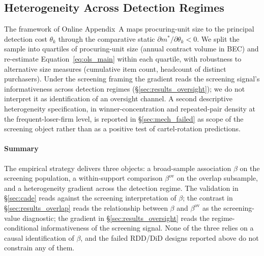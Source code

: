 \subsection{Heterogeneity Across Detection Regimes}
\label{sec:emp_heterogeneity}

The framework of Online Appendix~A maps procuring-unit size to
the principal detection cost $\theta_k$ through the comparative
static $\partial m^{*}/\partial\theta_k<0$. We split the sample
into quartiles of procuring-unit size (annual contract volume
in BEC) and re-estimate Equation~\eqref{eq:ols_main} within
each quartile, with robustness to alternative size measures
(cumulative item count, headcount of distinct purchasers).
Under the screening framing the gradient reads the screening
signal's informativeness across detection regimes
(§\ref{sec:results_oversight}); we do not interpret it as
identification of an oversight channel. A second descriptive
heterogeneity specification, in winner-concentration and
repeated-pair density at the frequent-loser-firm level, is
reported in §\ref{sec:mech_failed} as scope of the screening
object rather than as a positive test of cartel-rotation
predictions.

\paragraph*{Summary}
The empirical strategy delivers three objects: a broad-sample
association $\beta$ on the screening population, a within-support
comparison $\beta^{\text{ov}}$ on the overlap subsample, and a
heterogeneity gradient across the detection regime. The
validation in §\ref{sec:cade} reads against the screening
interpretation of $\beta$; the contrast in
§\ref{sec:results_overlap} reads the relationship between
$\beta$ and $\beta^{\text{ov}}$ as the screening-value
diagnostic; the gradient in §\ref{sec:results_oversight} reads
the regime-conditional informativeness of the screening signal.
None of the three relies on a causal identification of $\beta$,
and the failed RDD/DiD designs reported above do not constrain
any of them.
